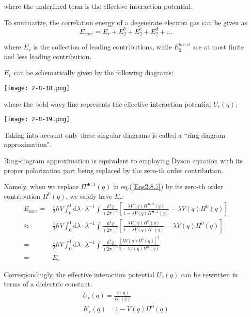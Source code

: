 where the underlined term is the effective interaction potential.

To summarize, the correlation energy of a degenerate electron gas can be given as
\[E_{corr} = E_r + E_2^b + E_2^c + E_2^d+\ldots\]

where $E_r$ is the collection of leading contributions, while $E_2^{b,c,d}$ are at most finite and less leading contribution.

$E_r$ can be schematically given by the following diagrams:
\begin{center} \label{Fig2.8.18}
\texttt{[image: 2-8-18.png]}
\end{center}

where the bold wavy line represents the effective interaction potential $U_r(q)$;
\begin{center} \label{Fig2.8.19}
\texttt{[image: 2-8-19.png]}
\end{center}

Taking into account only these singular diagrams is called a ``ring-diagram approximation".

Ring-diagram approximation is equivalent to employing Dyson equation with its proper polarization part being replaced by the zero-th order contribution.

Namely, when we replace $\Pi^{\bigstar,\lambda}(q)$ in eq.(\ref{Eqs2.8.7}) by its zero-th order contribution $\Pi^0(q)$, we safely have $E_r$:
\begin{equation*} \begin{split}
E_{corr} =&\frac{i}{2} \hbar V \int_0^1 \mathrm{d}\lambda \cdot \lambda^{-1} \int \frac{\mathrm{d}^4 q}{(2\pi)^4} \left[ \frac{\lambda V(q) \Pi^{\bigstar,\lambda}(q)}{1- \lambda V(q) \Pi^{\bigstar,\lambda}(q)} - \lambda V(q)\Pi^0(q) \right]\\
\approx& \frac{i}{2} \hbar V \int_0^1 \mathrm{d}\lambda \cdot \lambda^{-1} \int \frac{\mathrm{d}^4 q}{(2\pi)^4} \left[ \frac{\lambda V(q) \Pi^0(q)}{1- \lambda V(q) \Pi^0(q)} - \lambda V(q)\Pi^0(q) \right]\\
=& \frac{i}{2} \hbar V \int_0^1 \mathrm{d}\lambda \cdot \lambda^{-1} \int \frac{\mathrm{d}^4 q}{(2\pi)^4} \frac{[\lambda V(q) \Pi^0(q)]^2}{1- \lambda V(q) \Pi^0(q)}\\
=& E_r 
\end{split}\end{equation*}

Correspondingly, the effective interaction potential $U_r(q)$ can be rewritten in terms of a dielectric constant.
\begin{eqnarray}
U_r(q) = \frac{V(q)}{K_r(q)} \label{Eqs2.8.10}\\
K_r(q) = 1-V(q) \Pi^0(q) \label{Eqs2.8.11}
\end{eqnarray}

